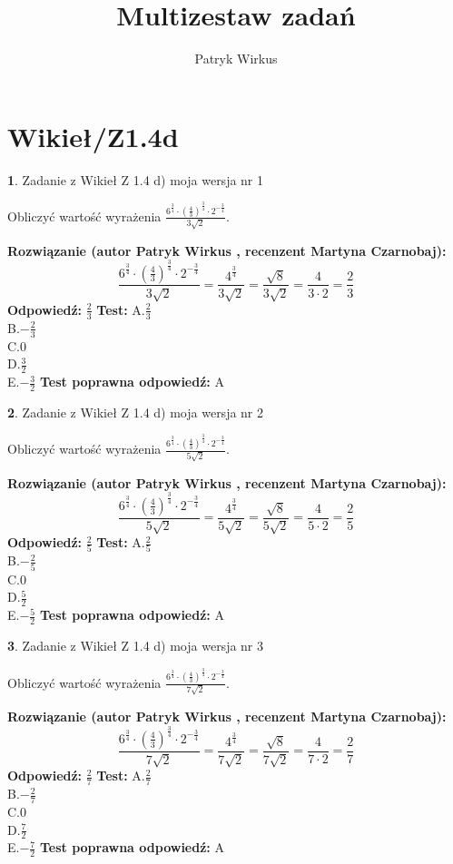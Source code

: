 \documentclass[12pt, a4paper]{article}
\title{Multizestaw zadań}
\author{Patryk Wirkus}
\date{}
\theoremstyle{definition} %
\newtheorem{zad}{}
\newcommand{\kategoria}[1]{\section{#1}}
\newcommand{\zadStart}[1]{\begin{zad}#1\newline}
\newcommand{\zadStop}{\end{zad}}
\newcommand{\rozwStart}[2]{\noindent \textbf{Rozwiązanie (autor #1 , recenzent #2): }\newline}
\newcommand{\rozwStop}{\newline}
\newcommand{\odpStart}{\noindent \textbf{Odpowiedź:}\newline}
\newcommand{\odpStop}{\newline}
\newcommand{\testStart}{\noindent \textbf{Test:}\newline}
\newcommand{\testStop}{\newline}
\newcommand{\kluczStart}{\noindent \textbf{Test poprawna odpowiedź:}\newline}
\newcommand{\kluczStop}{\newline}
\begin{document}
\maketitle

\kategoria{Wikieł/Z1.4d}


\zadStart{Zadanie z Wikieł Z 1.4 d) moja wersja nr 1}

Obliczyć wartość wyrażenia $\frac{6^{\frac{3}{4}}\cdot (\frac{4}{3})^{\frac{3}{4}}\cdot 2^{-\frac{3}{4}}}{3\sqrt{2}}$.
\zadStop
\rozwStart{Patryk Wirkus}{Martyna Czarnobaj}
$$\frac{6^{\frac{3}{4}}\cdot (\frac{4}{3})^{\frac{3}{4}}\cdot 2^{-\frac{3}{4}}}{3\sqrt{2}} = \frac{4^{\frac{3}{4}}}{3\sqrt{2}} = \frac{\sqrt{8}}{3\sqrt{2}} = \frac{4}{3\cdot 2} = \frac{2}{3}$$
\rozwStop
\odpStart
$\frac{2}{3}$
\odpStop
\testStart
A.$\frac{2}{3}$\\ B.$-\frac{2}{3}$\\ C.$0$\\ D.$\frac{3}{2}$\\ E.$-\frac{3}{2}$
\testStop
\kluczStart
A
\kluczStop



\zadStart{Zadanie z Wikieł Z 1.4 d) moja wersja nr 2}

Obliczyć wartość wyrażenia $\frac{6^{\frac{3}{4}}\cdot (\frac{4}{3})^{\frac{3}{4}}\cdot 2^{-\frac{3}{4}}}{5\sqrt{2}}$.
\zadStop
\rozwStart{Patryk Wirkus}{Martyna Czarnobaj}
$$\frac{6^{\frac{3}{4}}\cdot (\frac{4}{3})^{\frac{3}{4}}\cdot 2^{-\frac{3}{4}}}{5\sqrt{2}} = \frac{4^{\frac{3}{4}}}{5\sqrt{2}} = \frac{\sqrt{8}}{5\sqrt{2}} = \frac{4}{5\cdot 2} = \frac{2}{5}$$
\rozwStop
\odpStart
$\frac{2}{5}$
\odpStop
\testStart
A.$\frac{2}{5}$\\ B.$-\frac{2}{5}$\\ C.$0$\\ D.$\frac{5}{2}$\\ E.$-\frac{5}{2}$
\testStop
\kluczStart
A
\kluczStop



\zadStart{Zadanie z Wikieł Z 1.4 d) moja wersja nr 3}

Obliczyć wartość wyrażenia $\frac{6^{\frac{3}{4}}\cdot (\frac{4}{3})^{\frac{3}{4}}\cdot 2^{-\frac{3}{4}}}{7\sqrt{2}}$.
\zadStop
\rozwStart{Patryk Wirkus}{Martyna Czarnobaj}
$$\frac{6^{\frac{3}{4}}\cdot (\frac{4}{3})^{\frac{3}{4}}\cdot 2^{-\frac{3}{4}}}{7\sqrt{2}} = \frac{4^{\frac{3}{4}}}{7\sqrt{2}} = \frac{\sqrt{8}}{7\sqrt{2}} = \frac{4}{7\cdot 2} = \frac{2}{7}$$
\rozwStop
\odpStart
$\frac{2}{7}$
\odpStop
\testStart
A.$\frac{2}{7}$\\ B.$-\frac{2}{7}$\\ C.$0$\\ D.$\frac{7}{2}$\\ E.$-\frac{7}{2}$
\testStop
\kluczStart
A
\kluczStop
\end{document}
